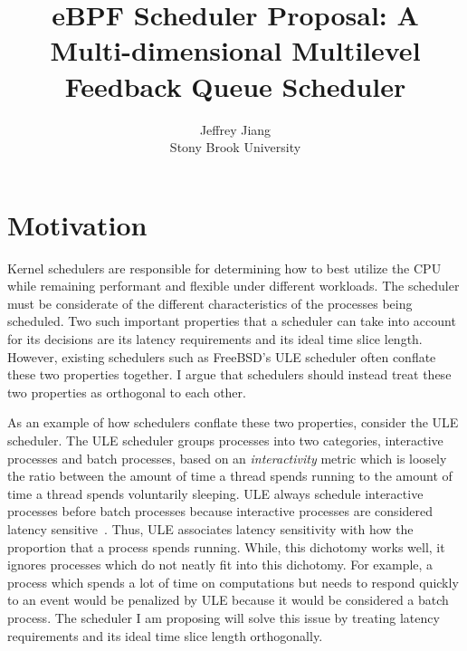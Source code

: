 \documentclass[letterpaper,twocolumn,10pt]{article}
\begin{document}

\date{}

\title{\Large \bf eBPF Scheduler Proposal: A Multi-dimensional Multilevel Feedback Queue Scheduler}

\author{
{\rm Jeffrey Jiang}\\
Stony Brook University
} %

\maketitle

\section{Motivation}

Kernel schedulers are responsible for determining how to best utilize the CPU
while remaining performant and flexible under different workloads. The scheduler
must be considerate of the different characteristics of the processes being
scheduled. Two such important properties that a scheduler can take into account
for its decisions are its latency requirements and its ideal time slice length. 
However, existing schedulers such as FreeBSD's ULE scheduler often conflate these 
two properties together. I argue that schedulers should instead treat these two 
properties as orthogonal to each other.

As an example of how schedulers conflate these two properties, consider the ULE
scheduler. The ULE scheduler groups processes into two categories, interactive
processes and batch processes, based on an \emph{interactivity} metric which
is loosely the ratio between the amount of time a thread spends running to
the amount of time a thread spends voluntarily sleeping. ULE always schedule
interactive processes before batch processes because interactive processes
are considered latency sensitive~\cite{ULEvsCFS}. Thus, ULE associates latency
sensitivity with how the proportion that a process spends running. While,
this dichotomy works well, it ignores processes which do not neatly fit into
this dichotomy. For example, a process which spends a lot of time on computations 
but needs to respond quickly to an event would be penalized by ULE because
it would be considered a batch process. The scheduler I am proposing will
solve this issue by treating latency requirements and its ideal time 
slice length orthogonally.
\end{document}
